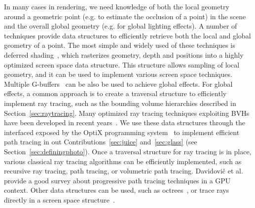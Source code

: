 In many cases in rendering, we need knowledge of both the local geometry around a geometric point (e.g. to estimate the occlusion of a point) in the scene and the overall global geometry (e.g. for global lighting effects). A number of techniques provide data structures to efficiently retrieve both the local and global geometry of a point. The most simple and widely used of these techniques is deferred shading~\cite{Saito1990}, which rasterizes geometry, depth and positions into a highly optimized screen space data structure. This structure allows sampling of local geometry, and it can be used to implement various screen space techniques. Multiple G-buffers~\cite{Mara2016} can be also be used to achieve global effects. For global effects, a common approach is to create a traversal structure to efficiently implement ray tracing, such as the bounding volume hierarchies described in Section~\ref{sec:raytracing}. Many optimized ray tracing techniques exploiting BVHs have been developed in recent years~\cite{Parker2010,Wald2014,Hendrich2017,Meister2018}. We use these data structures through the interfaced exposed by the OptiX programming system~\cite{Parker2010} to implement efficient path tracing in out Contributions~\ref{sec:juice} and~\ref{sec:glass} (see Section~\ref{sec:definingphoto}). Once a traversal structure for ray tracing is in place, various classical ray tracing algorithms can be efficiently implemented, such as recursive ray tracing, path tracing, or volumetric path tracing. Davidovi\v{c} et al.~\cite{Davidovic2014} provide a good survey about progressive path tracing techniques in a GPU context. Other data structures can be used, such as octrees~\cite{Glassner1988,Havran2000}, or trace rays directly in a screen space structure~\cite{Tanaka1986,McGuire2014, Widmer2015}. 

